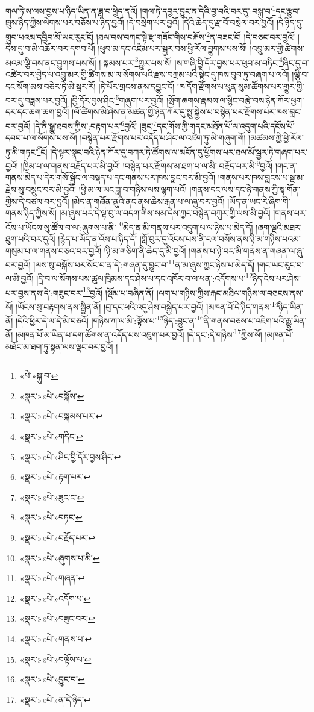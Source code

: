 གལ་ཏེ་ས་ལས་བྱས་པ་ཉིད་ཡིན་ན་ཟླ་བ་ཕྱེད་ནའོ། །གལ་ཏེ་དབྱར་བྱུང་ན་དེའི་བྱ་བའི་བར་དུ་:བསྐུ་བ་\footnote{«པེ་»སྐུ་བ་}དང་རྩུབ་ཁྲུས་ཉིད་ཀྱིས་ལེགས་པར་བཅོས་པ་ཉིད་བྱའོ། །དེ་བསྲེག་པར་བྱའོ། །དེའི་ཆེད་དུ་རྫ་བོ་བསྲེལ་བར་བྱའོ། །དེ་ཉིད་དུ་གྲུབ་པའམ་དབྱིབ་མོ་ཡང་རུང་ངོ། །ཐལ་བས་བཀང་སྟེ་རྫ་གཟོང་གིས་བརྐོས་\footnote{«སྣར་»«པེ་»བསྐོས་}ན་བཟང་ངོ། །དེ་བཅང་བར་བྱའོ། །དེས་དུ་བ་མི་འཆོར་བར་དགབ་པོ། །ཕུབ་མ་དང་འཇིམ་པར་སྦྱར་བས་ཕྱི་རོལ་བྱུགས་པས་སོ། །འབྲུ་མར་གྱི་ཚིགས་མའམ་ལྕི་བས་ནང་བྱུགས་པས་སོ། །:སྐམས་པར་\footnote{«སྣར་»«པེ་»བསྐམས་པར་}གྱུར་པས་སོ། །ས་གཞི་བྱི་དོར་བྱས་པར་ཕུབ་མ་བཏིང་\footnote{«སྣར་»«པེ་»གདིང་}ཞིང་དུ་བ་འཚེར་བར་བྱེད་པ་འབྲུ་མར་གྱི་ཚིགས་མ་ལ་སོགས་པའི་རྫས་བཀྲམ་པའི་སྟེང་དུ་ཁས་བུབ་ཏུ་བཞག་པ་ལའོ། །ལྕི་བ་དང་སོག་མས་བཅེར་ཏེ་མེ་སྦར་རོ། །ཏེ་པོར་གྲངས་ནས་དབྱུང་ངོ། །ཁ་དོག་རྫོགས་པ་ཕུན་སུམ་ཚོགས་པར་གྱུར་གྱི་བར་དུ་བཟླས་པར་བྱའོ། །བྱི་དོར་བྱས་ཤིང་\footnote{«སྣར་»«པེ་»ཤིང་བྱི་དོར་བྱས་ཤིང་}གཞུག་པར་བྱའོ། །སྲོག་ཆགས་རྣམས་ལ་སྙིང་བརྩེ་བས་ཉེན་ཀོར་ཕྱག་དར་དང་ཆག་ཆག་བྱའོ། །ལོ་ཚིགས་མི་ཤེས་ན་མཚན་གྱི་ཉེན་ཀོར་དུ་སྤུ་སྐྱེས་པ་བསྙེན་པར་རྫོགས་པར་ཁས་བླང་བར་བྱའོ། །དེ་ནི་སྒྱུ་ཐབས་ཀྱིས་:བརྟག་པར་\footnote{«སྣར་»«པེ་»རྟག་པར་}བྱའོ། །ཟུང་\footnote{«སྣར་»«པེ་»ཟུང་ང་}དང་གོས་ཀྱི་གདང་མཐོན་པོ་ལ་འདུག་པའི་དངོས་པོ་དབབ་པ་ལ་སོགས་པས་སོ། །བསྙེན་པར་རྫོགས་པར་འདོད་པ་ཤིང་ལ་འཛེག་ཏུ་མི་གཞུག་གོ། །མཚམས་ཀྱི་ཕྱི་རོལ་ཏུ་མི་གཏང་\footnote{«སྣར་»«པེ་»བཏང་}ངོ། །དེ་ལྟར་སྣང་བའི་ཉེན་ཀོར་དུ་བཀར་ཏེ་ཚོགས་ལ་མངོན་དུ་ཕྱོགས་པར་ཐལ་མོ་སྦྱར་ཏེ་གཞག་པར་བྱའོ། །ཁྱིམ་པ་ལ་གནས་བརྗོད་པར་མི་བྱའོ། །བསྙེན་པར་རྫོགས་མ་ཐག་པ་ལ་མི་:བརྗོད་པར་མི་\footnote{«སྣར་»«པེ་»བརྗོད་པར་}བྱའོ། །གང་ན་གནས་མེད་པ་དེར་གསོ་སྦྱོང་ལ་བསྡད་པ་དང་གནས་པར་ཁས་བླང་བར་མི་བྱའོ། །གནས་པར་ཁས་བླངས་པ་སྔ་མ་རྗེས་སུ་བསྲུང་བར་མི་བྱའོ། །ཕྱི་མ་ལ་ཡང་ཟླ་བ་གཉིས་ལས་ལྷག་པའོ། །གནས་དང་ལས་དང་ཉེ་གནས་ཀྱི་སྟ་གོན་གྱིས་དེ་བཙལ་བར་བྱའོ། །མེད་ན་གཞོན་ནུའི་ནང་ནས་ཆེས་རྒན་པ་ལ་ཞུ་བར་བྱའོ། །ཡོད་ན་ཡང་རེ་ཞིག་གི་གནས་ཉིད་ཀྱིས་སོ། །མ་ཞུས་པར་དེ་ལྟ་བུ་ལ་བདག་གིས་སམ་དེས་ཀྱང་བསྙེན་བཀུར་གྱི་ལས་མི་བྱའོ། །གནས་པར་འོས་པ་ཡོངས་སུ་ཚོལ་བ་ལ་:ཞུགས་པ་ནི་\footnote{«སྣར་»«པེ་»ཞུགས་པ་མི་}མེད་ན་མི་གནས་པར་འདུག་པ་ལ་ཉེས་པ་མེད་དོ། །ཞག་ལྔའི་མཐར་ཐུག་པའི་བར་དུའོ། །རྙེད་པ་ཡོད་ན་འོས་པ་ཉིད་དོ། །གློ་བུར་དུ་འོངས་པས་ནི་ངལ་བསོས་ནས་ཉི་མ་གཉིས་པའམ་གསུམ་པ་ལ་གནས་བཅའ་བར་བྱའོ། །ཉི་མ་གཅིག་ནི་ཆེད་དུ་མི་བྱའོ། །གནས་པ་ཉེ་བར་མི་གནས་ན་གཞན་ལ་ཞུ་བར་བྱའོ། །ལས་སུ་བསྐོས་པར་སོང་བ་ན་དེ་:གཞན་དུ་བྱུང་བ་\footnote{«སྣར་»«པེ་»གཞན་}ན་མ་ཞུས་ཀྱང་ཉེས་པ་མེད་དོ། །གང་ཡང་རུང་བ་ལ་མི་བྱའོ། །དྲི་བ་ལ་སོགས་པས་ཚུལ་ཁྲིམས་དང་ཤེས་པ་དང་འཁོར་བ་ལ་ཕན་:འདོགས་པ་\footnote{«སྣར་»«པེ་»འདོག་པ་}ཉིད་ངེས་པར་ཤེས་པར་བྱས་ནས་དེ་:གཟུང་བར་\footnote{«སྣར་»«པེ་»བཟུང་བར་}བྱའོ། །སྡོམ་པ་བཞིན་ནོ། །ལག་པ་གཉིས་ཀྱིས་རྐང་མཐིལ་གཉིས་ལ་བཅངས་ནས་སོ། །ཡོངས་སུ་བརྟགས་ནས་སྦྱིན་ནོ། །བུ་དང་ཕའི་འདུ་ཤེས་བསྐྱེད་པར་བྱའོ། །མཁན་པོ་དེ་ཉིད་གནས་\footnote{«སྣར་»«པེ་»གནས་པ་}ཉིད་ཡིན་ནོ། །དེའི་ཕྱིར་དེ་ལ་དེ་མི་བཅའོ། །གཉིས་ཀ་ལ་མི་:ལྟོས་པ་\footnote{«སྣར་»«པེ་»བལྟོས་པ་}ཉིད་:བྱུང་ན་\footnote{«སྣར་»«པེ་»བྱུང་བ་}ནི་གནས་བཅས་པ་འཇིག་པའི་རྒྱུ་ཡིན་ནོ། །མཁན་པོ་མ་ཡིན་པ་དག་ཚོགས་ན་འདོད་པས་འཇུག་པར་བྱའོ། །དེ་དང་:དེ་གཉིས་\footnote{«སྣར་»«པེ་»ན་དེ་ཉིད་}ཀྱིས་སོ། །མཁན་པོ་མཐོང་མ་ཐག་ཏུ་སྟན་ལས་ལྡང་བར་བྱའོ། །
